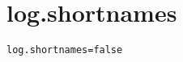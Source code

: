 \section{log.shortnames}
\label{configuration:LogShortnames}
\AvailableInJavaAndCsharp{\TODO}
\begin{lstlisting}[style=Props,caption={Usage example for \textit{log.shortnames}}]
log.shortnames=false
\end{lstlisting}